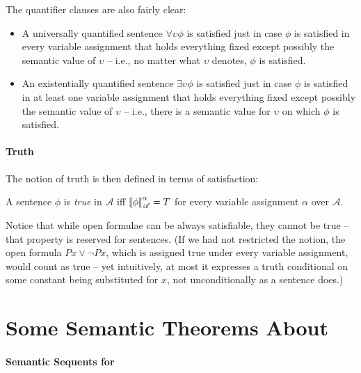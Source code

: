 The quantifier clauses are also fairly clear: \begin{itemize}
	\item A universally quantified sentence $\forall \upsilon \phi$ is satisfied just in case $\phi$ is satisfied in every variable assignment that holds everything fixed except possibly the semantic value of $\upsilon$ – i.e., no matter what $\upsilon$ denotes, $\phi$ is satisfied.
	\item An existentially quantified sentence $\exists \upsilon \phi$ is satisfied just in case $\phi$ is satisfied in at least one variable assignment that holds everything fixed except possibly the semantic value of $\upsilon$ – i.e., there is a semantic value for $\upsilon$ on which $\phi$ is satisfied.	
\end{itemize}

\paragraph{Truth}

The notion of truth is then defined in terms of satisfaction:
\begin{definition}[Truth]
	A sentence $\phi$ is \emph{true} in $\mathscr{A}$ iff $\left\llbracket\phi\right\rrbracket^{\alpha}_{\mathscr{A}}=T$ for every variable assignment $\alpha$ over $\mathscr{A}$. 
\end{definition}


Notice that while open formulae can be always satisfiable, they cannot be true – that property is reserved for sentences. (If we had not restricted the notion, the open formula $Px\vee\neg Px$, which is assigned true under every variable assignment, would count as true – yet intuitively, at most it expresses a truth conditional on some constant being substituted for $x$, not unconditionally as a sentence does.)


\section{Some Semantic Theorems About \texorpdfstring{\ltwo}{L2}}
\paragraph{Semantic Sequents for \ltwo}

